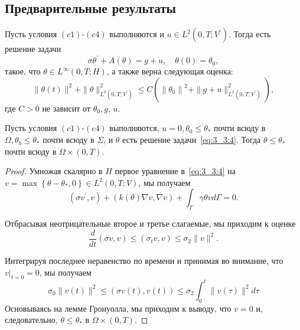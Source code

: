 \subsection{Предварительные результаты}
\label{subsec:ch3:sec3:subsec3}

\begin{lemma}
    \label{lm:3_3:1}
    Пусть условия $(c1)$-$(c4)$ выполняются и
    $u \in L^{2}\left(0, T ; V^{\prime}\right)$.
    Тогда есть решение задачи
    \begin{equation}
        \label{eq:3_3:4}
        \sigma \theta^{\prime}+A(\theta)=g+u, \quad \theta(0)=\theta_{0},
    \end{equation}
    такое, что $\theta \in L^{\infty}(0, T ; H)$, а также верна следующая оценка:
    \[
        \|\theta(t)\|^{2}+\|\theta\|_{L^{2}\left(0, T ; V^{\prime}\right)}^{2}
        \leq C\left(\left\|\theta_{0}\right\|^{2}+\|g+u\|_{L^{2}
        \left(0, T; V^{\prime}\right)}^{2}\right),
    \]
    где $C>0$ не зависит от $\theta_{0}, g$, $u$.
\end{lemma}

\begin{lemma}
    \label{lm:3_3:2}
    Пусть условия $(c1)$-$(c4)$ выполняются, $u=0, \theta_{0} \leq \theta_{*}$ почти всюду
    в $\Omega, \theta_{b} \leq \theta_{*}$ почти всюду в $\Sigma$, и $\theta$ есть
    решение задачи~\eqref{eq:3_3:4}.
    Тогда $\theta \leq \theta_{*}$ почти всюду в $\Omega \times(0, T)$.
\end{lemma}

\begin{proof}
    Умножая скалярно в $H$ первое уравнение в~\eqref{eq:3_3:4} на
    $v=\max \left\{\theta-\theta_{*}, 0\right\}\in L^{2}(0, T; V)$, мы получаем
    \[
        \left(\sigma v^{\prime}, v\right)+(k(\theta) \nabla v, \nabla v)
        + \int_{\Gamma} \gamma \theta v d \Gamma=0.
    \]

    Отбрасывая неотрицательные второе и третье слагаемые, мы приходим к оценке
    \[
        \frac{d}{d t}(\sigma v, v) \leq\left(\sigma_{t} v, v\right) \leq \sigma_{2}\|v\|^{2}.
    \]

    Интегрируя последнее неравенство по времени и принимая во внимание,
    что $\left.v\right|_{t=0}=0$, мы получаем
    \[
        \sigma_{0}\|v(t)\|^{2} \leq(\sigma v(t), v(t))
        \leq \sigma_{2} \int_{0}^{t}\|v(\tau)\|^{2} d \tau
    \]
    Основываясь на лемме Гронуолла, мы приходим к выводу, что $v=0$ и, следовательно,
    $\theta \leq \theta_{*}$ в $\Omega \times(0, T)$.
\end{proof}

